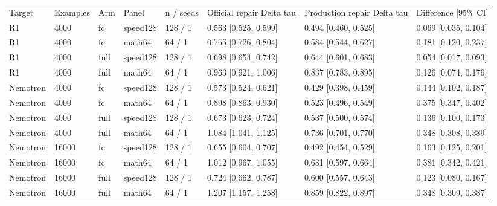 \begin{tabular}{llllllll}
Target & Examples & Arm & Panel & n / seeds & Official repair Delta tau & Production repair Delta tau & Difference [95\% CI] \\
R1 & 4000 & fc & speed128 & 128 / 1 & 0.563 [0.525, 0.599] & 0.494 [0.460, 0.525] & 0.069 [0.035, 0.104] \\
R1 & 4000 & fc & math64 & 64 / 1 & 0.765 [0.726, 0.804] & 0.584 [0.544, 0.627] & 0.181 [0.120, 0.237] \\
R1 & 4000 & full & speed128 & 128 / 1 & 0.698 [0.654, 0.742] & 0.644 [0.601, 0.683] & 0.054 [0.017, 0.093] \\
R1 & 4000 & full & math64 & 64 / 1 & 0.963 [0.921, 1.006] & 0.837 [0.783, 0.895] & 0.126 [0.074, 0.176] \\
Nemotron & 4000 & fc & speed128 & 128 / 1 & 0.573 [0.524, 0.621] & 0.429 [0.398, 0.459] & 0.144 [0.102, 0.187] \\
Nemotron & 4000 & fc & math64 & 64 / 1 & 0.898 [0.863, 0.930] & 0.523 [0.496, 0.549] & 0.375 [0.347, 0.402] \\
Nemotron & 4000 & full & speed128 & 128 / 1 & 0.673 [0.623, 0.724] & 0.537 [0.500, 0.574] & 0.136 [0.100, 0.173] \\
Nemotron & 4000 & full & math64 & 64 / 1 & 1.084 [1.041, 1.125] & 0.736 [0.701, 0.770] & 0.348 [0.308, 0.389] \\
Nemotron & 16000 & fc & speed128 & 128 / 1 & 0.655 [0.604, 0.707] & 0.492 [0.454, 0.529] & 0.163 [0.125, 0.201] \\
Nemotron & 16000 & fc & math64 & 64 / 1 & 1.012 [0.967, 1.055] & 0.631 [0.597, 0.664] & 0.381 [0.342, 0.421] \\
Nemotron & 16000 & full & speed128 & 128 / 1 & 0.724 [0.662, 0.787] & 0.600 [0.557, 0.643] & 0.123 [0.080, 0.167] \\
Nemotron & 16000 & full & math64 & 64 / 1 & 1.207 [1.157, 1.258] & 0.859 [0.822, 0.897] & 0.348 [0.309, 0.387] \\
\end{tabular}
